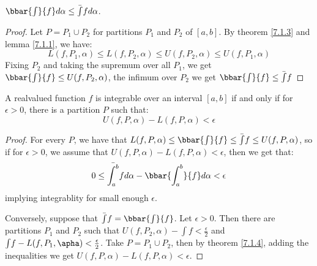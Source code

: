\begin{theorem}\label{7.1.4}
    $\bbar{\int}{f}d\alpha \leq \bar{\int}{f}d\alpha$.
\end{theorem}
\begin{proof}
    Let $P=P_1 \cup P_2$ for partitions $P_1$ and $P_2$ of $[a,b]$. By theorem
    \ref{7.1.3} and lemma  \ref{7.1.1}, we have:
        \begin{equation}
            L(f,P_1,\alpha) \leq L(f,P_2,\alpha) \leq U(f,P_2, \alpha) \leq
            U(f,P_1, \alpha)
        \end{equation}
        Fixing $P_2$ and taking the supremum over all $P_1$, we get
        $\bbar{\int}{f} \leq U(f,P_2,\alpha)$, the infimum over $P_2$ we
        get $\bbar{\int}{f} \leq \bar{\int}{f}$
\end{proof}

\begin{theorem}\label{7.1.5}
    A realvalued function $f$ is integrable over an interval  $[a,b]$ if and
    only if for $\epsilon>0$, there is a partition $P$ such that:
        \begin{equation}
            U(f,P,\alpha)-L(f,P,\alpha)<\epsilon		
        \end{equation} 
\end{theorem}
\begin{proof}
    For every $P$, we have that  $L(f,P,\alpha) \leq \bbar{\int}{f} \leq
    \bar{\int}{f} \leq U(f,P,\alpha)$, so if  for $\epsilon>0$, we assume that
    $U(f,P,\alpha)-L(f,P,\alpha)<\epsilon$, then we get that:
        \begin{equation}
            0 \leq
            \bar{\int_{a}^{b}}{f}d\alpha-\bbar{\int_{a}^{b}}{f}d\alpha<\epsilon		
        \end{equation} 
    implying integrablity for small enough $\epsilon$.
    
    Conversely, suppose that $\bar{\int}{f}=\bbar{\int}{f}$. Let  $\epsilon>0$.
    Then there are partitions  $P_1$ and $P_2$ such that
    $U(f,P_2,\alpha)-{\int}{f}<\frac{\epsilon}{2}$ and
    ${\int}{f}-L(f,P_1,\apha)<\frac{\epsilon}{2}$. Take $P=P_1 \cup P_2$, then
    by theorem \ref{7.1.4}, adding the inequalities we get
    $U(f,P,\alpha)-L(f,P,\alpha)<\epsilon$.
\end{proof}


